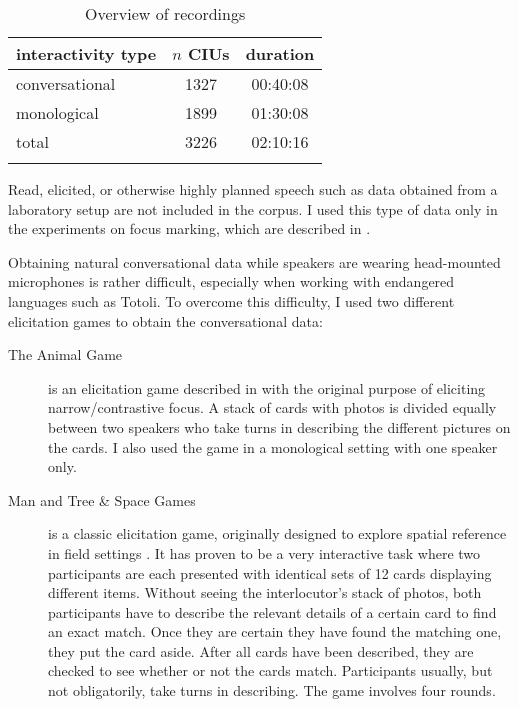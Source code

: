 \begin{table}
	\caption{Overview of recordings}
	\label{Overview_recordings}
	\begin{tabular}{lcc}
		\lsptoprule
		interactivity type & $n$ CIUs & duration \\\midrule
		conversational & 1327  & 00:40:08 \\  
		monological    & 1899  & 01:30:08 \\ \midrule
		total          & 3226  & 02:10:16 \\
		\lspbottomrule
	\end{tabular}
\end{table}




Read, elicited, or otherwise highly planned speech such as data obtained from a laboratory setup are not included in the corpus. I used this type of data only in the experiments on focus marking, which are described in .

Obtaining natural conversational data while speakers are wearing head-mounted microphones is rather difficult, especially when working with endangered languages such as Totoli. To overcome this difficulty, I used two different elicitation games to obtain the conversational data:



\begin{description}
	\item [The Animal Game] is an elicitation game described in \citet[111--117]{Skopeteas.2006b} with the original purpose of eliciting narrow/contrastive focus.   
	A stack of cards with photos is divided equally between two speakers who take turns in describing the different pictures on the cards. I also used the game  in a monological setting with one speaker only.
	\item [Man and Tree \& Space Games] is a classic elicitation game, originally designed to explore spatial reference  in field settings \citep{Levinson.1992c}.  It has proven to be a very interactive task where two participants are each presented with identical sets of 12 cards displaying different items. Without seeing the interlocutor's stack of photos, both participants have to describe the relevant details of a certain card to find an exact match. Once they are certain they have found the matching one, they put the card aside. After all cards have been described, they are checked to see whether or not the cards match. Participants usually, but not obligatorily, take turns in describing. The game involves four rounds.
\end{description}



